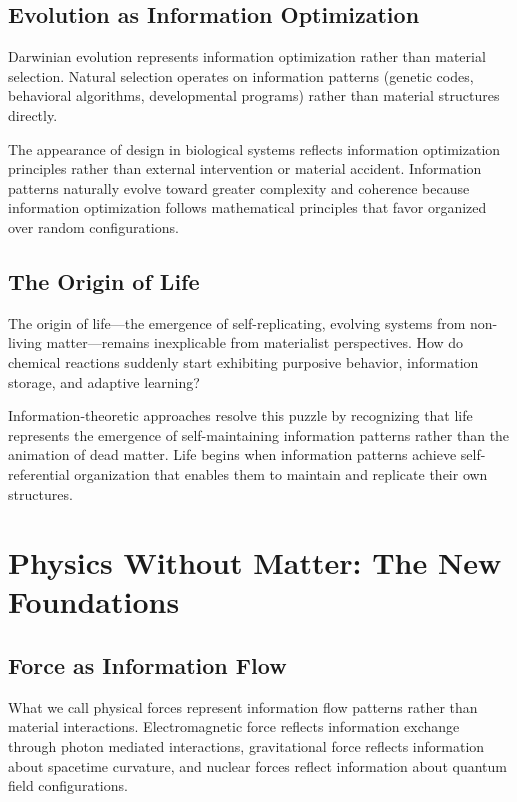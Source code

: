 \documentclass[12pt]{article}
\begin{document}
\subsection{Evolution as Information Optimization}

Darwinian evolution represents information optimization rather than material selection. Natural selection operates on information patterns (genetic codes, behavioral algorithms, developmental programs) rather than material structures directly.

The appearance of design in biological systems reflects information optimization principles rather than external intervention or material accident. Information patterns naturally evolve toward greater complexity and coherence because information optimization follows mathematical principles that favor organized over random configurations.

\subsection{The Origin of Life}

The origin of life—the emergence of self-replicating, evolving systems from non-living matter—remains inexplicable from materialist perspectives. How do chemical reactions suddenly start exhibiting purposive behavior, information storage, and adaptive learning?

Information-theoretic approaches resolve this puzzle by recognizing that life represents the emergence of self-maintaining information patterns rather than the animation of dead matter. Life begins when information patterns achieve self-referential organization that enables them to maintain and replicate their own structures.

\section{Physics Without Matter: The New Foundations}

\subsection{Force as Information Flow}

What we call physical forces represent information flow patterns rather than material interactions. Electromagnetic force reflects information exchange through photon mediated interactions, gravitational force reflects information about spacetime curvature, and nuclear forces reflect information about quantum field configurations.
\end{document}
